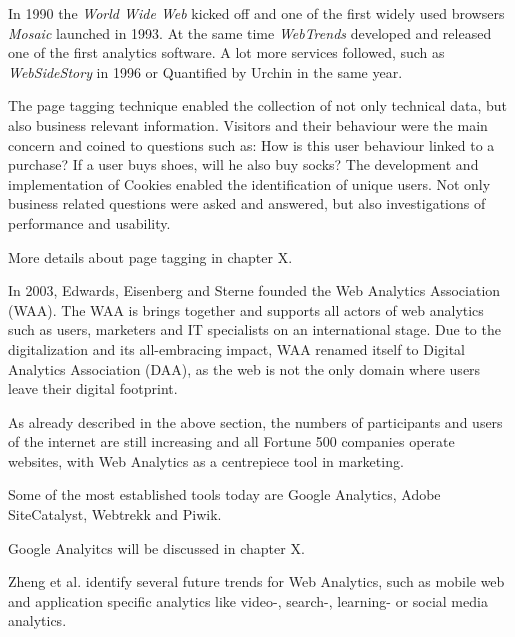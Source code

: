 
In 1990 the \textit{World Wide Web} kicked off and one of the first widely used browsers \textit{Mosaic} launched in 1993.
At the same time \textit{WebTrends} developed and released one of the first analytics software.
A lot more services followed, such as \textit{WebSideStory} in 1996 %
or Quantified by Urchin in the same year.%

The page tagging technique enabled the collection of not only technical data, but also business relevant information.
Visitors and their behaviour were the main concern and coined to questions such as: How is this user behaviour linked to a purchase? If a user buys shoes, will he also buy socks?
The development and implementation of Cookies enabled the identification of unique users.
Not only business related questions were asked and answered, but also investigations of performance and usability.

More details about page tagging in chapter X.


In 2003, Edwards, Eisenberg and Sterne founded the Web Analytics Association (WAA).
The WAA is brings together and supports all actors of web analytics such as users, marketers and IT specialists on an international stage.
Due to the digitalization and its all-embracing impact, WAA renamed itself to Digital Analytics Association (DAA), as the web is not the only domain where users leave their digital footprint.

As already described in the above section, the numbers of participants and users of the internet are still increasing and all Fortune 500 companies operate websites, with Web Analytics as a centrepiece tool in marketing. %

Some of the most established tools today are Google Analytics, Adobe SiteCatalyst, Webtrekk and Piwik. %

Google Analyitcs will be discussed in chapter X.

Zheng et al. identify several future trends for Web Analytics, such as mobile web and application specific analytics like video-, search-, learning- or social media analytics. %







